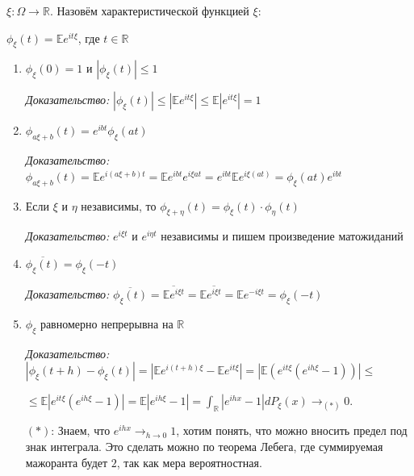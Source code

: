 \begin{definition}
    $\xi : \Omega \to \mathbb{R}$. Назовём характеристической функцией $\xi$:

    $\phi_\xi (t) = \mathbb{E} e^{it\xi}$, где $t \in \mathbb{R}$
\end{definition}

\begin{properties}
    \begin{enumerate}
        \item {
            $\phi_\xi (0) = 1$ и $|\phi_\xi (t)| \leqslant 1$

            \textit{Доказательство: } $|\phi_\xi (t)| \leqslant |\mathbb{E} e^{it\xi}| \leqslant \mathbb{E}|e^{it\xi}| = 1$
        }
        \item {
            $\phi_{a\xi + b} (t) = e^{ibt} \phi_\xi (at)$

            \textit{Доказательство: } $\phi_{a\xi + b} (t) = \mathbb{E} e^{i(a \xi + b)t} = \mathbb{E} e^{ibt} e^{i\xi a t} = e^{ibt} \mathbb{E} e^{i\xi (at)} = \phi_{\xi} (at) e^{ibt} $
        }
        \item {
            Если $\xi$ и $\eta$ независимы, то $\phi_{\xi + \eta} (t) = \phi_\xi (t) \cdot \phi_{\eta} (t)$

            \textit{Доказательство: } $e^{i\xi t}$ и $e^{i \eta t}$ независимы и пишем произведение матожиданий
        }
        \item {
            $\overline{\phi_{\xi}(t)} = \phi_{\xi} (-t)$

            \textit{Доказательство: } $\overline{\phi_{\xi}(t)} = \overline{\mathbb{E} e^{i \xi t}} = \mathbb{E} \overline{e^{i \xi t}} = \mathbb{E} e^{-i \xi t} = \phi_\xi (-t)$
        }
        \item {
            $\phi_{\xi}$ равномерно непрерывна на $\mathbb{R}$

            \textit{Доказательство: } $|\phi_{\xi}(t + h) - \phi_{\xi}(t)| = | \mathbb{E} e^{i (t + h) \xi} - \mathbb{E} e^{i t \xi} | = | \mathbb{E} \left( e^{it \xi} (e^{i h \xi} - 1) \right) | \leq $

            $\leq \mathbb{E} \left| e^{it \xi} (e^{i h \xi} - 1) \right| = \mathbb{E} | e^{i h \xi} - 1 | = \int_{\mathbb{R}} | e^{i h x} - 1 | d P_{\xi}(x) \rightarrow_{(*)} 0$.

            $(*)$: Знаем, что $e^{i h x} \rightarrow_{h \to 0} 1$, хотим понять, что можно вносить предел под знак интеграла. Это сделать можно по теорема Лебега, где суммируемая мажоранта будет $2$, так как мера вероятностная.



        }
    \end{enumerate}
\end{properties}

